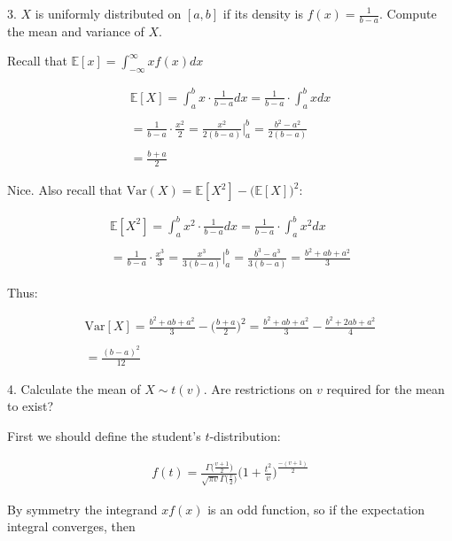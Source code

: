 \documentclass[10pt]{article}
\begin{document}
\newpage

3. $X$ is uniformly distributed on $[a, b]$ if its density is $f(x) = \frac{1}{b - a}$. Compute the mean and variance of $X$.

Recall that $\mathbb{E}[x] = \int_{-\infty}^{\infty}xf(x) dx$

\begin{gather*}
    \mathbb{E}[X] = \int_{a}^{b} x \cdot \frac{1}{b - a} dx = \frac{1}{b - a}\cdot \int_{a}^{b} x dx \\
    \\
    = \frac{1}{b - a}\cdot \frac{x^2}{2} = \frac{x^2}{2(b - a)} \Big|_a^b = \frac{b^2 - a^2}{2(b - a)} \\
    \\
    = \frac{b + a}{2}
    \end{gather*}    

Nice. Also recall that $\text{Var}(X) = \mathbb{E}[X^2] - \big(\mathbb{E}[X]\big)^2$:

\begin{gather*}
    \mathbb{E}[X^2] = \int_{a}^{b} x^2 \cdot \frac{1}{b - a} dx = \frac{1}{b - a}\cdot \int_{a}^{b} x^2 dx \\
    \\
    = \frac{1}{b - a} \cdot \frac{x^3}{3} = \frac{x^3}{3(b-a)} \Big|_a^b = \frac{b^3 - a^3}{3(b-a)} = \frac{b^2 + ab + a^2}{3}
    \end{gather*}

Thus: 

\begin{gather*}
    \text{Var}[X] = \frac{b^2 + ab + a^2}{3} - \Big(\frac{b + a}{2}\Big)^2 = \frac{b^2 + ab + a^2}{3} - \frac{b^2 + 2ab + a^2}{4} \\
    \\
    = \frac{(b - a)^2}{12}
\end{gather*}    

\newpage

4. Calculate the mean of $X \sim t(v)$. Are restrictions on $v$ required for the mean to exist?

First we should define the student's $t$-distribution:

\begin{gather*}
    f(t) = \frac{\Gamma \big(\frac{v + 1}{2}\big)}{\sqrt{\pi v}\Gamma \big(\frac{v}{2}\big)}\Big(1 + \frac{t^2}{v}\Big)^{\frac{-(v+1)}{2}}
\end{gather*}

By symmetry the integrand $xf(x)$ is an odd function, so if the expectation integral converges, then 
\end{document}
